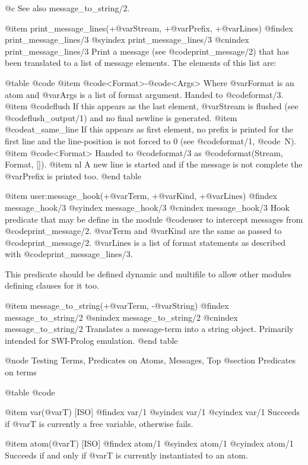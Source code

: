 {{{{@c See also message_to_string/2.

@item print_message_lines(+@var{Stream}, +@var{Prefix}, +@var{Lines})
@findex print_message_lines/3
@syindex print_message_lines/3
@cnindex print_message_lines/3
Print a message (see @code{print_message/2}) that has been translated to
a list of message elements.  The elements of this list are:

@table @code
    @item @code{<Format>}-@code{<Args>}
        Where @var{Format} is an atom and @var{Args} is a list
	of format argument.  Handed to @code{format/3}.
    @item @code{flush}
	If this appears as the last element, @var{Stream} is flushed
	(see @code{flush_output/1}) and no final newline is generated.
    @item @code{at_same_line}
        If this appears as first element, no prefix is printed for
	the first line and the line-position is not forced to 0
	(see @code{format/1}, @code{~N}).
    @item @code{<Format>}
        Handed to @code{format/3} as @code{format(Stream, Format, [])}.
    @item nl
        A new line is started and if the message is not complete
	the @var{Prefix} is printed too.
@end table

@item user:message_hook(+@var{Term}, +@var{Kind}, +@var{Lines})
@findex message_hook/3
@syindex message_hook/3
@cnindex message_hook/3
Hook predicate that may be define in the module @code{user} to intercept
messages from @code{print_message/2}. @var{Term} and @var{Kind} are the
same as passed to @code{print_message/2}. @var{Lines} is a list of
format statements as described with @code{print_message_lines/3}.

This predicate should be defined dynamic and multifile to allow other
modules defining clauses for it too.

@item message_to_string(+@var{Term}, -@var{String})
@findex message_to_string/2
@snindex message_to_string/2
@cnindex message_to_string/2 
Translates a message-term into a string object. Primarily intended for SWI-Prolog emulation.
@end table

@node Testing Terms, Predicates on Atoms, Messages, Top
@section Predicates on terms

@table @code

@item var(@var{T}) [ISO]
@findex var/1
@syindex var/1
@cyindex var/1
Succeeds if @var{T} is currently a free variable, otherwise fails. 

@item atom(@var{T}) [ISO]
@findex atom/1
@syindex atom/1
@cyindex atom/1
Succeeds if and only if @var{T} is currently instantiated to an  atom.

}}}}
